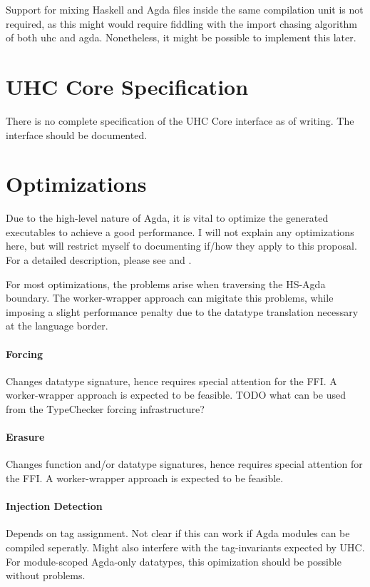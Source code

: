 \documentclass[12pt, a4paper, twoside]{report}
\begin{document}
Support for mixing Haskell and Agda files inside the same compilation unit is not required, as this
might would require fiddling with the import chasing algorithm of both uhc and agda. Nonetheless,
it might be possible to implement this later.

\section{UHC Core Specification}
There is no complete specification of the UHC Core interface as of writing. The interface
should be documented.

\section{Optimizations}
Due to the high-level nature of Agda, it is vital to optimize the generated
executables to achieve a good performance. I will not explain any optimizations here,
but will restrict myself to documenting if/how they apply to this proposal.
For a detailed description, please see \cite{fredriksson2011totaly} and \cite{Brady-store-indices2004}.

For most optimizations, the problems arise when traversing the HS-Agda boundary. The worker-wrapper
approach can migitate this problems, while imposing a slight performance penalty due to the
datatype translation necessary at the language border.
\paragraph{Forcing}
Changes datatype signature, hence requires special attention for the FFI.
A worker-wrapper approach is expected to be feasible.
TODO what can be used from the TypeChecker forcing infrastructure?

\paragraph{Erasure}
Changes function and/or datatype signatures, hence requires special attention for the FFI.
A worker-wrapper approach is expected to be feasible.

\paragraph{Injection Detection}
Depends on tag assignment. Not clear if this can work if Agda modules can be compiled
seperatly. Might also interfere with the tag-invariants expected by UHC.
For module-scoped Agda-only datatypes, this opimization should be possible without
problems.
\end{document}
